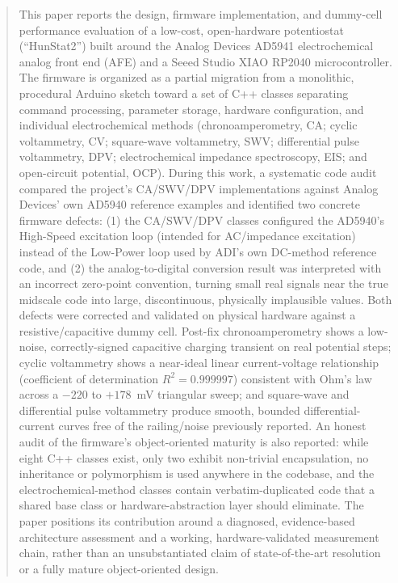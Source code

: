 \documentclass[preprint,12pt]{elsarticle}
\begin{document}
\begin{frontmatter}
\begin{abstract}
This paper reports the design, firmware implementation, and dummy-cell performance evaluation of a low-cost, open-hardware potentiostat (``HunStat2'') built around the Analog Devices AD5941 electrochemical analog front end (AFE) and a Seeed Studio XIAO RP2040 microcontroller. The firmware is organized as a partial migration from a monolithic, procedural Arduino sketch toward a set of C++ classes separating command processing, parameter storage, hardware configuration, and individual electrochemical methods (chronoamperometry, CA; cyclic voltammetry, CV; square-wave voltammetry, SWV; differential pulse voltammetry, DPV; electrochemical impedance spectroscopy, EIS; and open-circuit potential, OCP). During this work, a systematic code audit compared the project's CA/SWV/DPV implementations against Analog Devices' own AD5940 reference examples and identified two concrete firmware defects: (1) the CA/SWV/DPV classes configured the AD5940's High-Speed excitation loop (intended for AC/impedance excitation) instead of the Low-Power loop used by ADI's own DC-method reference code, and (2) the analog-to-digital conversion result was interpreted with an incorrect zero-point convention, turning small real signals near the true midscale code into large, discontinuous, physically implausible values. Both defects were corrected and validated on physical hardware against a resistive/capacitive dummy cell. Post-fix chronoamperometry shows a low-noise, correctly-signed capacitive charging transient on real potential steps; cyclic voltammetry shows a near-ideal linear current-voltage relationship (coefficient of determination $R^2 = 0.999997$) consistent with Ohm's law across a $-220$ to $+178$~mV triangular sweep; and square-wave and differential pulse voltammetry produce smooth, bounded differential-current curves free of the railing/noise previously reported. An honest audit of the firmware's object-oriented maturity is also reported: while eight C++ classes exist, only two exhibit non-trivial encapsulation, no inheritance or polymorphism is used anywhere in the codebase, and the electrochemical-method classes contain verbatim-duplicated code that a shared base class or hardware-abstraction layer should eliminate. The paper positions its contribution around a diagnosed, evidence-based architecture assessment and a working, hardware-validated measurement chain, rather than an unsubstantiated claim of state-of-the-art resolution or a fully mature object-oriented design.
\end{abstract}


\end{frontmatter}
\end{document}
